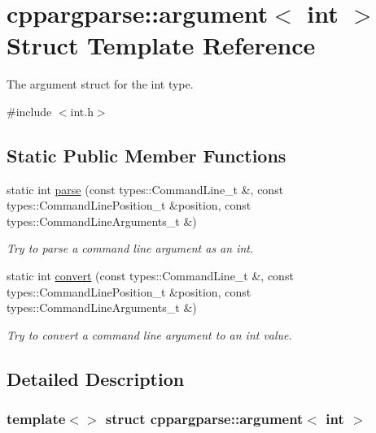 \hypertarget{structcppargparse_1_1argument_3_01int_01_4}{}\section{cppargparse\+:\+:argument$<$ int $>$ Struct Template Reference}
\label{structcppargparse_1_1argument_3_01int_01_4}


The argument struct for the int type.  




{\ttfamily \#include $<$int.\+h$>$}

\subsection*{Static Public Member Functions}
\begin{DoxyCompactItemize}
\item 
static int \hyperlink{structcppargparse_1_1argument_3_01int_01_4_af6a2f748b086ad7122f7bb6affbe354e}{parse} (const types\+::\+Command\+Line\+\_\+t \&, const types\+::\+Command\+Line\+Position\+\_\+t \&position, const types\+::\+Command\+Line\+Arguments\+\_\+t \&)
\begin{DoxyCompactList}\small\item\em Try to parse a command line argument as an int. \end{DoxyCompactList}\item 
static int \hyperlink{structcppargparse_1_1argument_3_01int_01_4_a8c3b45ea01897660bf5d1e5f7c9d7c41}{convert} (const types\+::\+Command\+Line\+\_\+t \&, const types\+::\+Command\+Line\+Position\+\_\+t \&position, const types\+::\+Command\+Line\+Arguments\+\_\+t \&)
\begin{DoxyCompactList}\small\item\em Try to convert a command line argument to an int value. \end{DoxyCompactList}\end{DoxyCompactItemize}


\subsection{Detailed Description}
\subsubsection*{template$<$$>$\newline
struct cppargparse\+::argument$<$ int $>$}

